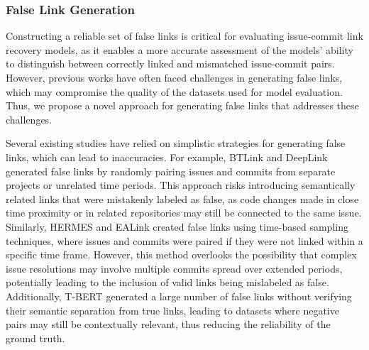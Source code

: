 \subsubsection*{False Link Generation}


Constructing a reliable set of false links is critical for evaluating issue-commit link recovery models, as it enables a more accurate assessment of the models' ability to distinguish between correctly linked and mismatched issue-commit pairs. However, previous works have often faced challenges in generating false links, which may compromise the quality of the datasets used for model evaluation. Thus, we propose a novel approach for generating false links that addresses these challenges.

\noindent
Several existing studies have relied on simplistic strategies for generating false links, which can lead to inaccuracies. For example, BTLink \cite{btlink} and DeepLink \cite{q1} generated false links by randomly pairing issues and commits from separate projects or unrelated time periods. This approach risks introducing semantically related links that were mistakenly labeled as false, as code changes made in close time proximity or in related repositories may still be connected to the same issue. Similarly, HERMES \cite{hermes} and EALink \cite{ealink} created false links using time-based sampling techniques, where issues and commits were paired if they were not linked within a specific time frame. However, this method overlooks the possibility that complex issue resolutions may involve multiple commits spread over extended periods, potentially leading to the inclusion of valid links being mislabeled as false. Additionally, T-BERT \cite{tbert} generated a large number of false links without verifying their semantic separation from true links, leading to datasets where negative pairs may still be contextually relevant, thus reducing the reliability of the ground truth.\\





